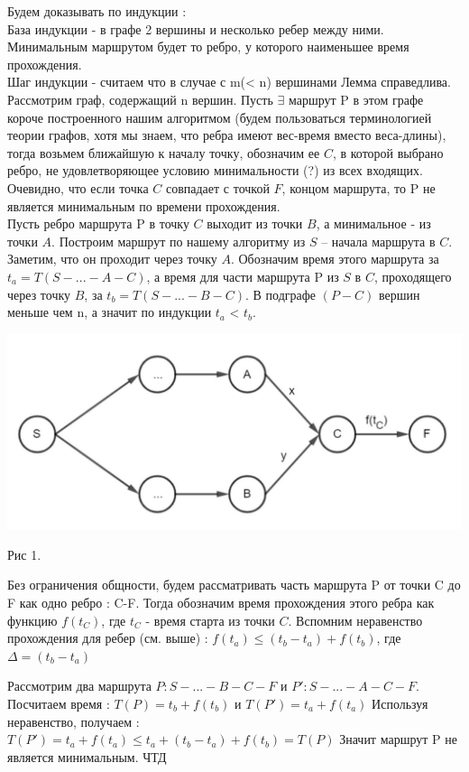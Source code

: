 \documentclass[12pt, a4paper]{article}
\begin{document}
Будем доказывать по индукции :\\
База индукции - в графе 2 вершины и несколько ребер между ними. Минимальным маршрутом будет то ребро, у которого наименьшее время прохождения.\\
Шаг индукции - считаем что в случае с m(< n) вершинами Лемма справедлива. Рассмотрим граф, содержащий n вершин. Пусть $\exists$ маршрут P в этом графе короче построенного нашим алгоритмом (будем пользоваться терминологией теории графов, хотя мы знаем, что ребра имеют вес-время вместо веса-длины), тогда возьмем ближайшую к началу точку, обозначим ее $C$, в которой выбрано ребро, не удовлетворяющее условию минимальности (?) из всех входящих. Очевидно, что если точка $C$ совпадает с точкой $F$, концом маршрута, то P не является минимальным по времени прохождения. \\
 Пусть ребро маршрута P в точку $C$ выходит из точки $B$, а минимальное - из точки $A$. Построим маршрут по нашему алгоритму из $S$ -- начала маршрута в $C$. Заметим, что он проходит через точку $A$. Обозначим время этого маршрута за $t_a = T(S-...-A-C)$, а время для части маршрута P из $S$ в $C$, проходящего через точку $B$, за $t_b = T(S-...-B-C)$. В подграфе $(P-C)$ вершин меньше чем n, а значит по индукции $t_a$ < $t_b$. 
\begin{center}
\includegraphics[scale=0.3]{graph_1.jpg}
\end{center}
\begin{center}
Рис 1.
\end{center}

Без ограничения общности, будем рассматривать часть маршрута P от точки C до F как одно ребро : C-F. Тогда обозначим время прохождения этого ребра как функцию $f(t_C)$, где $t_C$ - время старта из точки $C$. Вспомним неравенство прохождения для ребер (см. выше) : $f(t_a) \le (t_b - t_a) + f(t_b)$, где $\Delta = (t_b - t_a)$

Рассмотрим два маршрута $P : S-...-B-C-F$ и $P': S-...-A-C-F$.
Посчитаем время : $T(P) = t_b + f(t_b)$  и $T(P') = t_a + f(t_a)$
Используя неравенство, получаем : $T(P') = t_a + f(t_a) \le t_a + (t_b - t_a) + f(t_b) = T(P)$ Значит маршрут P не является минимальным. ЧТД
\end{document}
